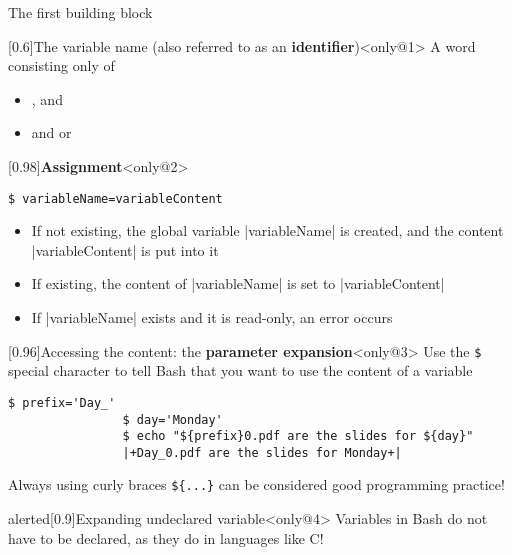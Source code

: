\begin{frame}[fragile]{The first building block}
\begin{overlayarea}{\textwidth}{0.3\textheight}
        \begin{varblock*}{}[0.6\textwidth]{The variable name (also referred to as an \textbf{identifier})}<only@1>
            A word consisting only of
            \begin{itemize}
                \item {},  and 
                \item and  or 
            \end{itemize}
        \end{varblock*}
        \begin{varblock*}{}[0.98\textwidth]{\textbf{Assignment}}<only@2>
            \begin{lstlisting}[style=MyBash, numbers=none, xrightmargin=26mm, xleftmargin=26mm]
                $ variableName=variableContent
            \end{lstlisting}
            \begin{itemize}
                \item If not existing, the \alert{global} variable \bash|variableName| is created, and the content \bash|variableContent| is put into it
                \item If existing, the content of \bash|variableName| is set to \bash|variableContent|
                \item If \bash|variableName| exists and it is read-only, an error occurs
            \end{itemize}
        \end{varblock*}
        \begin{varblock}{}[0.96\textwidth]{Accessing the content: the \textbf{parameter expansion}}<only@3>
            Use the \texttt{\$} special character to tell Bash that you want to use the content of a variable
            \begin{lstlisting}[style=MyBash, numbers=none, belowskip=-5mm]
                $ prefix='Day_'
                $ day='Monday'
                $ echo "${prefix}0.pdf are the slides for ${day}"
                |+Day_0.pdf are the slides for Monday+|
            \end{lstlisting}
            \alert{Always} using curly braces \alert{\texttt{\$\{...\}}} can be considered \alert{good programming practice}!
        \end{varblock}
        \begin{varblock}{alerted}[0.9\textwidth]{Expanding undeclared variable}<only@4>
            Variables in Bash do not have to be declared, as they do in languages like C!\\

\end{varblock}
\end{overlayarea}
\end{frame}
